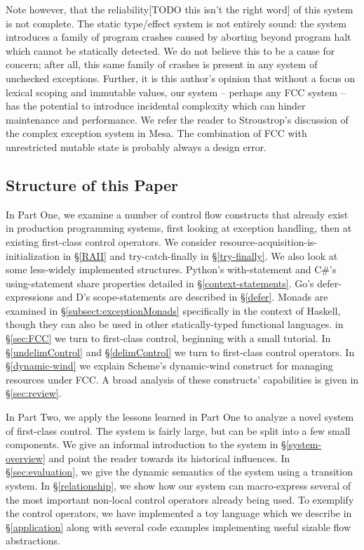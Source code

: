 \documentclass[11pt]{article}
\begin{document}
Note however, that the reliability[TODO this isn't the right word] of this system is not complete.
The static type/effect system is not entirely sound: the system introduces a family of program crashes caused by aborting beyond program halt which cannot be statically detected.
We do not believe this to be a cause for concern; after all, this same family of crashes is present in any system of unchecked exceptions.
Further, it is this author's opinion that without a focus on lexical scoping and immutable values, our system -- perhaps any FCC system -- has the potential to introduce incidental complexity which can hinder maintenance and performance.
We refer the reader to Stroustrop's discussion\cite{evolutionCplusplus} of the complex exception system in Mesa.
The combination of FCC with unrestricted mutable state is probably always a design error.

\subsection{Structure of this Paper}

In Part One, we examine a number of control flow constructs that already exist in production programming systems, first looking at exception handling, then at existing first-class control operators.
We consider resource-acquisition-is-initialization in \S\ref{RAII} and try-catch-finally in \S\ref{try-finally}.
We also look at some less-widely implemented structures.
Python's with-statement and C\#'s using-statement share properties detailed in \S\ref{context-statements}.
Go's defer-expressions and D's scope-statements are described in \S\ref{defer}.
Monads are examined in \S\ref{subsect:exceptionMonads} specifically in the context of Haskell, though they can also be used in other statically-typed functional languages.
in \S\ref{sec:FCC} we turn to first-class control, beginning with a small tutorial.
In \S\ref{undelimControl} and \S\ref{delimControl} we turn to first-class control operators.
In \S\ref{dynamic-wind} we explain Scheme's dynamic-wind construct for managing resources under FCC.
A broad analysis of these constructs' capabilities is given in \S\ref{sec:review}.

In Part Two, we apply the lessons learned in Part One to analyze a novel system of first-class control.
The system is fairly large, but can be split into a few small components.
We give an informal introduction to the system in \S\ref{system-overview} and point the reader towards its historical influences.
In \S\ref{sec:evaluation}, we give the dynamic semantics of the system using a transition system.
In \S\ref{relationship}, we show how our system can macro-express several of the most important non-local control operators already being used.
To exemplify the control operators, we have implemented a toy language which we describe in \S\ref{application} along with several code examples implementing useful sizable flow abstractions.
\end{document}
